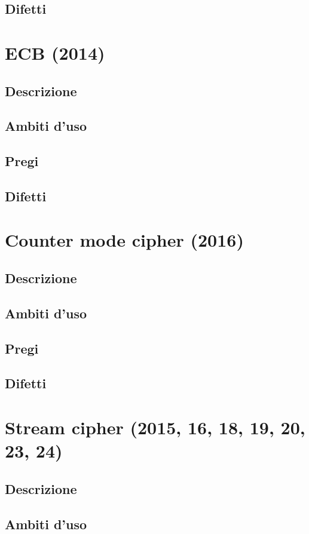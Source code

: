 \documentclass[10pt,oneside,a4paper]{article}
\begin{document}
\subsection{Difetti}
\section{ECB (2014)}
\subsection{Descrizione}
\subsection{Ambiti d'uso}
\subsection{Pregi}
\subsection{Difetti}
\section{Counter mode cipher (2016)}
\subsection{Descrizione}
\subsection{Ambiti d'uso}
\subsection{Pregi}
\subsection{Difetti}
\section{Stream cipher (2015, 16, 18, 19, 20, 23, 24)}
\subsection{Descrizione}
\subsection{Ambiti d'uso}
\end{document}
